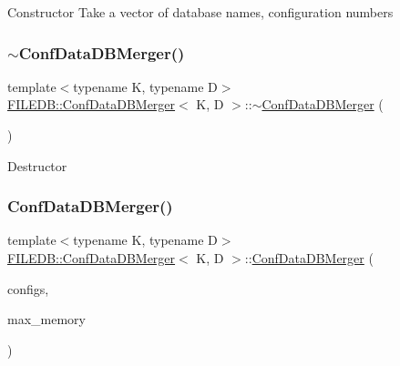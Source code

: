 Constructor Take a vector of database names, configuration numbers \mbox{\label{classFILEDB_1_1ConfDataDBMerger_a1592d55d089ad7ead813ab8d2b955e09}} 
\subsubsection{\texorpdfstring{$\sim$ConfDataDBMerger()}{~ConfDataDBMerger()}\hspace{0.1cm}{\footnotesize\ttfamily [1/3]}}
{\footnotesize\ttfamily template$<$typename K, typename D$>$ \\
\mbox{\hyperlink{classFILEDB_1_1ConfDataDBMerger}{F\+I\+L\+E\+D\+B\+::\+Conf\+Data\+D\+B\+Merger}}$<$ K, D $>$\+::$\sim$\mbox{\hyperlink{classFILEDB_1_1ConfDataDBMerger}{Conf\+Data\+D\+B\+Merger}} (\begin{DoxyParamCaption}\item[{void}]{ }\end{DoxyParamCaption})\hspace{0.3cm}{\ttfamily [inline]}}

Destructor \mbox{\label{classFILEDB_1_1ConfDataDBMerger_a2d22aeb10cb29cd9acb42cbd042c74d3}} 
\subsubsection{\texorpdfstring{ConfDataDBMerger()}{ConfDataDBMerger()}\hspace{0.1cm}{\footnotesize\ttfamily [3/6]}}
{\footnotesize\ttfamily template$<$typename K, typename D$>$ \\
\mbox{\hyperlink{classFILEDB_1_1ConfDataDBMerger}{F\+I\+L\+E\+D\+B\+::\+Conf\+Data\+D\+B\+Merger}}$<$ K, D $>$\+::\mbox{\hyperlink{classFILEDB_1_1ConfDataDBMerger}{Conf\+Data\+D\+B\+Merger}} (\begin{DoxyParamCaption}\item[{const std\+::vector$<$ \mbox{\hyperlink{classFILEDB_1_1ConfigInfo}{Config\+Info}} $>$ \&}]{configs,  }\item[{unsigned int}]{max\+\_\+memory }\end{DoxyParamCaption})\hspace{0.3cm}{\ttfamily [inline]}}


